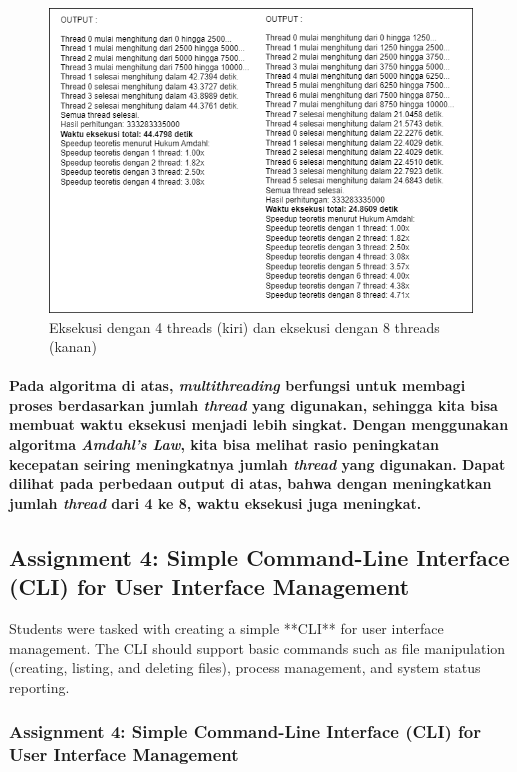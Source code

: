 \documentclass[12pt]{article}
\begin{document}
\begin{figure}[H]
    \centering
    \includegraphics[width=1\linewidth]{asset/31.png}
    \caption{Eksekusi dengan 4 threads (kiri) dan eksekusi dengan 8 threads (kanan)}
\end{figure}

\paragraph{
    \hspace*{1cm} Pada algoritma di atas, \textit{multithreading} berfungsi untuk membagi proses berdasarkan jumlah \textit{thread} yang digunakan, sehingga kita bisa membuat waktu eksekusi menjadi lebih singkat. Dengan menggunakan algoritma \textit{Amdahl's Law}, kita bisa melihat rasio peningkatan kecepatan seiring meningkatnya jumlah \textit{thread} yang digunakan. Dapat dilihat pada perbedaan output di atas, bahwa dengan meningkatkan jumlah \textit{thread} dari 4 ke 8, waktu eksekusi juga meningkat.
}



\subsection{Assignment 4: Simple Command-Line Interface (CLI) for User Interface Management}
Students were tasked with creating a simple **CLI** for user interface management. The CLI should support basic commands such as file manipulation (creating, listing, and deleting files), process management, and system status reporting.

\subsubsection{Assignment 4: Simple Command-Line Interface (CLI) for User Interface Management}
\end{document}
